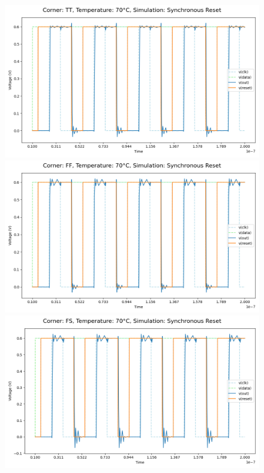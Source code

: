 \begin{figure}[H]
    \centering
    \includegraphics[height= 0.21\textheight]{figures/aimspice/TT70W3.png}
    \vspace{5pt}
    \includegraphics[height= 0.21\textheight]{figures/aimspice/FF70W3.png}
    \vspace{5pt}
    \includegraphics[height= 0.21\textheight]{figures/aimspice/FS70W3.png}

\end{figure}
